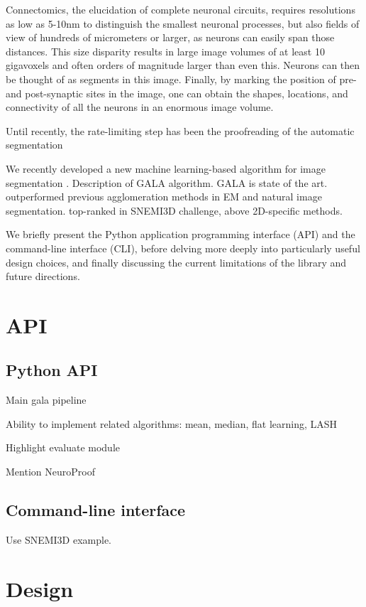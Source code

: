 \documentclass{frontiersSCNS} %
\begin{document}
Connectomics, the elucidation of complete neuronal circuits, requires resolutions as low as 5-10nm to distinguish the smallest neuronal processes, but also fields of view of hundreds of micrometers or larger, as neurons can easily span those distances.
This size disparity results in large image volumes of at least 10 gigavoxels and often orders of magnitude larger than even this.
Neurons can then be thought of as segments in this image.
Finally, by marking the position of pre- and post-synaptic sites in the image, one can obtain the shapes, locations, and connectivity of all the neurons in an enormous image volume.

Until recently, the rate-limiting step has been the proofreading of the automatic segmentation \cite{Chklovskii:2010df}

We recently developed a new machine learning-based algorithm for image segmentation \citep{NunezIglesias:2013cd}.
Description of GALA algorithm.
GALA is state of the art. outperformed previous agglomeration methods in EM and natural image segmentation. top-ranked in SNEMI3D challenge, above 2D-specific methods.

We briefly present the Python application programming interface (API) and the command-line interface (CLI), before delving more deeply into particularly useful design choices, and finally discussing the current limitations of the library and future directions.


\section{API}


\subsection{Python API}

Main gala pipeline

Ability to implement related algorithms: mean, median, flat learning, LASH

Highlight evaluate module

Mention NeuroProof


\subsection{Command-line interface}

Use SNEMI3D example.


\section{Design}
\end{document}
